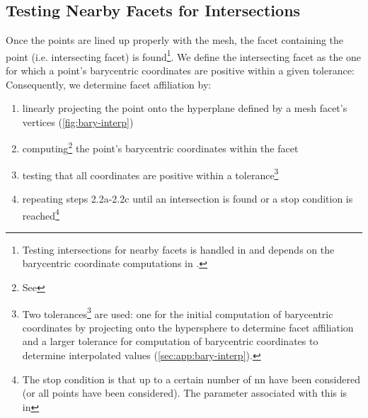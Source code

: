 \documentclass[final,12pt]{elsarticle}
\begin{document}
\subsection{Testing Nearby Facets for Intersections}
\label{sec:app:bary:int:facets}
Once the \outpt{} points are lined up properly with the mesh, the facet containing the \outpt{} point (i.e. intersecting facet) is found\footnote{Testing intersections for nearby facets is handled in  and depends on the barycentric coordinate computations in .}. We define the intersecting facet as the one for which a point's barycentric coordinates are positive within a given tolerance:
Consequently, we determine facet affiliation by:
\begin{enumerate}%
	\item[2.2a] linearly projecting the \outpt{} point onto the hyperplane defined by a mesh facet's vertices (\cref{fig:bary-interp})
	\item[2.2b] computing\footnote{See } the point's barycentric coordinates within the facet \cite{anatoliyCheckIfRay2015,skalaRobustBarycentricCoordinates2013}
	\item[2.2c] testing that all coordinates are positive \cite{langerSphericalBarycentricCoordinates2006} within a tolerance\footnote{Two tolerances\footnote{We typically use  in  and  in , respectively. } are used: one for the initial computation of barycentric coordinates by projecting onto the hypersphere to determine facet affiliation and a larger tolerance for computation of barycentric coordinates to determine interpolated values (\cref{sec:app:bary-interp}). }
	\item[2.2d] repeating steps 2.2a-2.2c until an intersection is found or a stop condition is reached\footnote{The stop condition is that up to a certain number of \gls{nn} have been considered (or all points have been considered). The parameter associated with this is  in  }
\end{enumerate}
\end{document}
